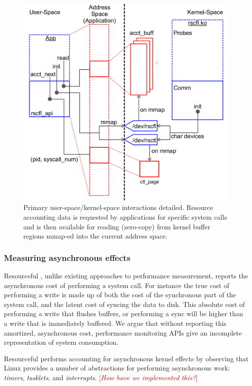 \documentclass[letterpaper,twocolumn,10pt]{article}
\newcommand{\pname}{Resourceful}
\newcommand{\lnote}[1]{\textcolor{red}{[\textit{#1}]}} %
\begin{document}
\begin{figure}[ht!] 
	\centering 
	\includegraphics[width=1.1\columnwidth]{sys_design}
	\caption{Primary user-space/kernel-space interactions detailed. Resource
accounting data is requested by applications for specific system calls and is
then available for reading (zero-copy) from kernel buffer regions mmap-ed into
the current address space. } 
	\label{fig:design}
\end{figure}

\subsubsection{Measuring asynchronous effects}
\pname{ }, unlike existing approaches to performance measurement, reports the
asynchronous cost of performing a system call. For instance the true cost of
performing a write is made up of both the cost of the synchronous part of the
system call, and the latent cost of syncing the data to disk. This absolute cost
of performing a write that flushes buffers, or performing a sync will be higher
than a write that is immediately buffered. We argue that without reporting this
amortized, asynchronous cost, performance monitoring APIs give an incomplete
representation of system consumption.

\pname{ } performs accounting for asynchronous kernel effects by observing that
Linux provides a number of abstractions for performing asynchronous work:
\emph{timers}, \emph{tasklets}, and \emph{interrupts}. \lnote{How have we
implemented this?}
\end{document}
